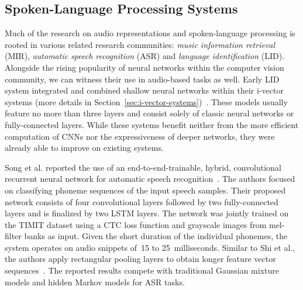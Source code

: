 \subsection{Spoken-Language Processing Systems}
Much of the research on audio representations and spoken-language processing is rooted in various related research communities: \emph{music information retrieval} (MIR), \emph{automatic speech recognition} (ASR) and \emph{language identification} (LID). Alongside the rising popularity of neural networks within the computer vision community, we can witness their use in audio-based tasks as well. Early LID system integrated and combined shallow neural networks within their i-vector systems (more details in Section~\ref{sec:i-vector-systems})~\cite{gonzalez2014automatic, han2013trap, matejka2014neural, richardson2015unified}. These models usually feature no more than three layers and consist solely of classic neural networks or fully-connected layers. While these systems benefit neither from the more efficient computation of CNNs nor the expressiveness of deeper networks, they were already able to improve on existing systems.

Song et al. reported the use of an end-to-end-trainable, hybrid, convolutional recurrent neural network for automatic speech recognition~\cite{song2015end}. The authors focused on classifying phoneme sequences of the input speech samples. Their proposed network consists of four convolutional layers followed by two fully-connected layers and is finalized by two LSTM layers. The network was jointly trained on the TIMIT dataset using a CTC loss function and grayscale images from mel-filter banks as input. Given the short duration of the individual phonemes, the system operates on audio snippets of~\num{15} to \num{25}~milliseconds. Similar to Shi et al., the authors apply rectangular pooling layers to obtain longer feature vector sequences~\cite{shi2016end}. The reported results compete with traditional Gaussian mixture models and hidden Markov models for ASR tasks.

